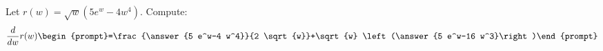 \documentclass{ximera}
\author{Bart Snapp\and Nela Lakos}
\begin{document}
\begin{exercise}
Let $r(w) = \sqrt{w} \left(5 e^w-4 w^4\right)$. Compute:
\[
\frac{d}{dw}r(w)
\begin{prompt}=\frac{\answer{5 e^w-4 w^4}}{2 \sqrt{w}}+\sqrt{w} \left(\answer{5 e^w-16 w^3}\right)\end{prompt}
\]
\end{exercise}
\end{document}
